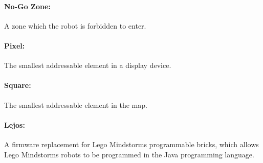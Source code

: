 \documentclass[11pt, a4paper]{report}
\begin{document}
\paragraph{No-Go Zone:} A zone which the robot is forbidden to enter.

\paragraph{Pixel:} The smallest addressable element in a display device.

\paragraph{Square:} The smallest addressable element in the map.

\paragraph{Lejos:} A firmware replacement for Lego Mindstorms programmable bricks, which allows Lego Mindstorms robots to be programmed in the Java programming language.


\pagebreak{}
\end{document}

